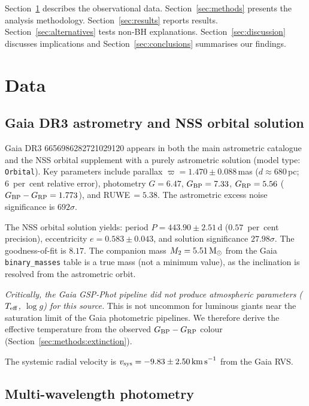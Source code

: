 \documentclass[usenatbib,fleqn]{mnras}
\newcommand{\Msun}{{\rm M}_\odot}
\newcommand{\kms}{{\rm km\,s}^{-1}}
\begin{document}
Section~\ref{sec:data} describes the observational data.
Section~\ref{sec:methods} presents the analysis methodology.
Section~\ref{sec:results} reports results.
Section~\ref{sec:alternatives} tests non-BH explanations.
Section~\ref{sec:discussion} discusses implications and
Section~\ref{sec:conclusions} summarises our findings.

\section{Data}
\label{sec:data}

\subsection{Gaia DR3 astrometry and NSS orbital solution}
\label{sec:data:gaia}

Gaia DR3 6656986282721029120 appears in both the main astrometric
catalogue and the NSS orbital supplement with a purely astrometric
solution (model type: \texttt{Orbital}).  Key parameters include
parallax $\varpi = 1.470 \pm 0.088$\,mas
($d \approx 680$\,pc; 6~per~cent relative error), photometry
$G = 6.47$, $G_{\rm BP} = 7.33$, $G_{\rm RP} = 5.56$
($G_{\rm BP} - G_{\rm RP} = 1.773$), and RUWE$\,= 5.38$.
The astrometric excess noise significance is $692\sigma$.

The NSS orbital solution yields:
period $P = 443.90 \pm 2.51$\,d ($0.57$~per~cent precision),
eccentricity $e = 0.583 \pm 0.043$, and solution significance
$27.98\sigma$.  The goodness-of-fit is $8.17$.  The companion mass
$M_2 = 5.51\,\Msun$ from the Gaia \texttt{binary\_masses} table is
a true mass (not a minimum value), as the inclination is resolved
from the astrometric orbit.

\emph{Critically, the Gaia GSP-Phot pipeline did not produce
atmospheric parameters ($T_{\rm eff}$, $\log g$) for this source.}
This is not uncommon for luminous giants near the saturation limit
of the Gaia photometric pipelines.  We therefore derive the
effective temperature from the observed $G_{\rm BP} - G_{\rm RP}$
colour (Section~\ref{sec:methods:extinction}).

The systemic radial velocity is
$v_{\rm sys} = -9.83 \pm 2.50\,\kms$ from the Gaia RVS.

\subsection{Multi-wavelength photometry}
\label{sec:data:phot}
\end{document}
